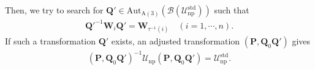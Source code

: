 Then, we try to search for $\bm{Q}' \in \mathrm{Aut}_{\mathrm{A}(3)}(\mathcal{B}(\mathcal{U}_{\mathrm{np}}^{\mathrm{std}}))$ such that
\begin{align}
  \bm{Q}'^{-1} \bm{W}_{i} \bm{Q}' = \bm{W}_{\tau^{-1}(i)}
    \quad (i = 1, \cdots, n).
\end{align}
If such a transformation $\bm{Q}'$ exists, an adjusted transformation $(\bm{P}, \bm{Q}_{0}\bm{Q}')$ gives
\begin{align}
  (\bm{P}, \bm{Q}_{0}\bm{Q}')^{-1} \mathcal{U}_{\mathrm{np}} (\bm{P}, \bm{Q}_{0}\bm{Q}') = \mathcal{U}_{\mathrm{np}}^{\mathrm{std}}.
\end{align}


%
